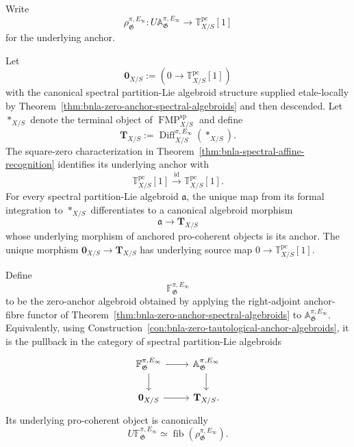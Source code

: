 Write
\[
    \rho^{\pi,E_\infty}_{\mathfrak G}:
    U\mathbb A^{\pi,E_\infty}_{\mathfrak G}
    \longrightarrow
    \mathbb T^{\mathrm{pc}}_{X/S}[1]
\]
for the underlying anchor.

\begin{construction}
\label{con:bnla-zero-tautological-anchor-algebroids}
Let
\[
    \mathbf 0_{X/S}
    :=
    \left(
        0\longrightarrow\mathbb T^{\mathrm{pc}}_{X/S}[1]
    \right)
\]
with the canonical spectral partition-Lie algebroid structure supplied
etale-locally by
Theorem~\ref{thm:bnla-zero-anchor-spectral-algebroids} and then descended.
Let $\ast_{X/S}$ denote the terminal object of
$\operatorname{FMP}^{\mathrm{sp}}_{X/S}$ and define
\[
    \mathbf T_{X/S}
    :=
    \operatorname{Diff}^{\pi,E_\infty}_{X/S}(\ast_{X/S}).
\]
The square-zero characterization in
Theorem~\ref{thm:bnla-spectral-affine-recognition} identifies its underlying
anchor with
\[
    \mathbb T^{\mathrm{pc}}_{X/S}[1]
    \xrightarrow{\operatorname{id}}
    \mathbb T^{\mathrm{pc}}_{X/S}[1].
\]
For every spectral partition-Lie algebroid $\mathfrak a$, the unique map from
its formal integration to $\ast_{X/S}$ differentiates to a canonical
algebroid morphism
\[
    \mathfrak a\longrightarrow\mathbf T_{X/S}
\]
whose underlying morphism of anchored pro-coherent objects is its anchor.
The unique morphism
$\mathbf 0_{X/S}\to\mathbf T_{X/S}$ has underlying source map
$0\to\mathbb T^{\mathrm{pc}}_{X/S}[1]$.
\end{construction}

\begin{definition}
\label{def:bnla-spectral-partition-anchor-fibre}
Define
\[
\boxed{
    \mathbb F^{\pi,E_\infty}_{\mathfrak G}}
\]
to be the zero-anchor algebroid obtained by applying the right-adjoint
anchor-fibre functor of
Theorem~\ref{thm:bnla-zero-anchor-spectral-algebroids} to
$\mathbb A^{\pi,E_\infty}_{\mathfrak G}$.  Equivalently, using
Construction~\ref{con:bnla-zero-tautological-anchor-algebroids}, it is the
pullback in the category of spectral partition-Lie algebroids
\[
\begin{tikzcd}
\mathbb F^{\pi,E_\infty}_{\mathfrak G}
  \arrow[r] \arrow[d] &
\mathbb A^{\pi,E_\infty}_{\mathfrak G}
  \arrow[d]\\
\mathbf 0_{X/S} \arrow[r] &
\mathbf T_{X/S}.
\end{tikzcd}
\]
Its underlying pro-coherent object is canonically
\[
    U\mathbb F^{\pi,E_\infty}_{\mathfrak G}
    \simeq
    \operatorname{fib}
    \left(
        \rho^{\pi,E_\infty}_{\mathfrak G}
    \right).
\]
\end{definition}

